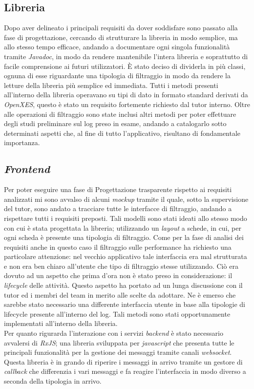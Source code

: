 \subsection{Libreria}
Dopo aver delineato i principali requisiti da dover soddisfare sono passato alla fase di progettazione, cercando di strutturare la libreria in modo semplice, ma allo stesso tempo efficace, andando a documentare ogni singola funzionalità tramite \textit{\gls{Javadoc}}, in modo da rendere mantenibile l'intera libreria e soprattutto di facile comprensione ai futuri utilizzatori. È stato deciso di dividerla in più classi, ognuna di esse riguardante una tipologia di filtraggio in modo da rendere la letture della libreria più semplice ed immediata. Tutti i metodi presenti all'interno della libreria operavano su tipi di dato in formato standard derivati da \textit{OpenXES}, questo è stato un requisito fortemente richiesto dal tutor interno. Oltre alle operazioni di filtraggio sono state inclusi altri metodi per poter effettuare degli studi preliminare sul log preso in esame, andando a catalogarlo sotto determinati aspetti che, al fine di tutto l'applicativo, risultano di fondamentale importanza.
\subsection{\textit{Frontend}}
Per poter eseguire una fase di Progettazione trasparente rispetto ai requisiti analizzati mi sono avvalso di alcuni \textit{mockup} tramite il quale, sotto la supervisione del tutor, sono andato a tracciare tutte le interfacce di filtraggio, andando a rispettare tutti i requisiti preposti. Tali modelli sono stati ideati allo stesso modo con cui è stata progettata la libreria; utilizzando un \textit{layout} a schede, in cui, per ogni scheda è presente una tipologia di filtraggio. Come per la fase di analisi dei requisiti anche in questo caso il filtraggio sulle performance ha richiesto una particolare attenzione: nel vecchio applicativo tale interfaccia era mal strutturata e non era ben chiaro all'utente che tipo di filtraggio stesse utilizzando. Ciò era dovuto ad un aspetto che prima d'ora non è stato preso in considerazione: il \textit{lifecycle} delle attività. Questo aspetto ha portato ad un lunga discussione con il tutor ed i membri del team in merito alle scelte da adottare. Ne è emerso che sarebbe stato necessario una differente interfaccia utente in base alla tipologie di lifecycle presente all'interno del log. Tali metodi sono stati opportunamente implementati all'interno della libreria.\\
Per quanto rigurarda l'interazione con i servizi \textit{backend} è stato necessario avvalersi di \textit{RxJS}; una libreria sviluppata per \textit{javascript} che presenta tutte le principali funzionalità per la gestione dei messaggi tramite canali \textit{websocket}. Questa libreria è in grando di riperire i messaggi in arrivo tramite un gestore di \textit{callback} che differenzia i vari messaggi e fa reagire l'interfaccia in modo diverso a seconda della tipologia in arrivo.

